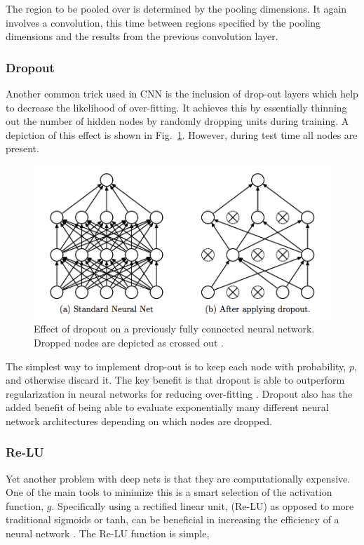 \documentclass[12pt, twocolumn]{article}
\begin{document}
The region to be pooled over is determined by the pooling dimensions. It again involves a convolution, this time between regions specified by the pooling dimensions and the results from the previous convolution layer. 

\subsubsection{Dropout}

Another common trick used in CNN is the inclusion of drop-out layers which help to decrease the likelihood of over-fitting. It achieves this by essentially thinning out the number of hidden nodes by randomly dropping units during training.  A depiction of this effect is shown in Fig.~\ref{fig:dropout}. However, during test time all nodes are present. 
\begin{figure}
\includegraphics[scale=.52]{dropout.png}

\caption{Effect of dropout on a previously fully connected neural network. Dropped nodes are depicted as crossed out \cite{Dropout}. }
\label{fig:dropout}
\end{figure}

The simplest way to implement drop-out is to keep each node with probability, $p$, and otherwise discard it. The key benefit is that dropout is able to outperform regularization in neural networks for reducing over-fitting \cite{Dropout}. Dropout also has the added benefit of being able to evaluate exponentially many different neural network architectures depending on which nodes are dropped.
 
\subsubsection{Re-LU}

Yet another problem with deep nets is that they are computationally expensive. One of the main tools to minimize this is a smart selection of the activation function, $g$. Specifically using a rectified linear unit, (Re-LU) as opposed to more traditional sigmoids or tanh, can be beneficial in increasing the efficiency of a neural network \cite{imagenet}. The Re-LU function is simple, 
\end{document}

